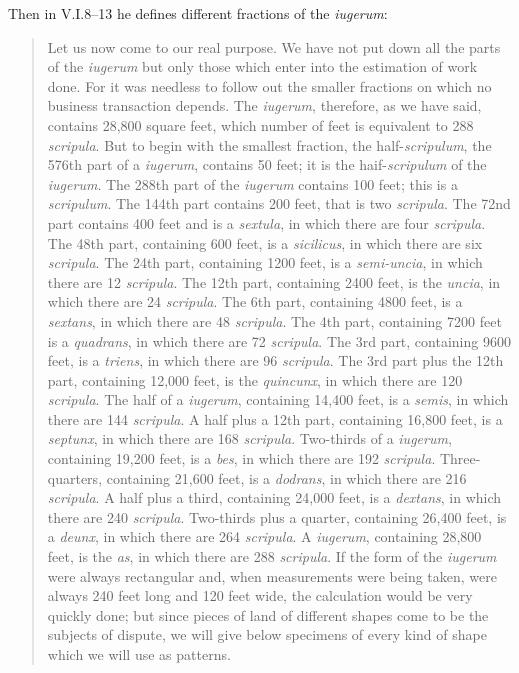 Then in V.I.8--13 \cite[pp.~9--13]{columellaII} he defines different fractions of the {\em iugerum}:

\begin{quote}
Let us now come to our real purpose. We have not put down all the parts of the {\em iugerum} but only those which enter into the estimation of work done. For it was needless to
follow out the smaller fractions on which no business transaction depends. The {\em iugerum}, therefore, as we have said, contains 28,800 square feet, which number of feet is 
equivalent to 288 {\em scripula}. But to begin with the smallest fraction, the half-{\em scripulum}, the 576th part of a {\em iugerum}, contains 50 feet; it is the haif-{\em scripulum} of
the {\em iugerum}. The 288th part of the {\em iugerum} contains 100 feet; this is a {\em scripulum}. The 144th part contains 200 feet, that is two {\em scripula}. The 72nd part contains 
400 feet and is a {\em sextula}, in which there are four {\em scripula}. The 48th part, containing 600 feet, is a {\em sicilicus}, in which there
are six {\em scripula}. The 24th part, containing 1200 feet, is a {\em semi-uncia}, in which there are 12 {\em scripula}. The 12th part, containing 2400 feet, is the {\em uncia}, in
which there are 24 {\em scripula}. The 6th part, containing 4800 feet, is a {\em sextans}, in which there are 48 {\em scripula}. The 4th part, containing 7200 feet is a {\em quadrans},
in which there are 72 {\em scripula}. The 3rd part, containing 9600 feet, is a {\em triens}, in which there are 96 {\em scripula}. The 3rd part plus the 12th part, containing 12,000 feet,
is the {\em quincunx}, in which there are 120 {\em scripula}. The half of a {\em iugerum}, containing 14,400 feet, is a {\em semis}, in which there are 144 {\em scripula}. A half plus
a 12th part, containing 16,800 feet, is a {\em septunx}, in which there are 168 {\em scripula}. Two-thirds of a {\em iugerum}, containing 19,200 feet, is a {\em bes}, in which there are
192 {\em scripula}. Three-quarters, containing 21,600 feet, is a {\em dodrans}, in which there are 216 {\em scripula}. A half plus a third, containing 24,000 feet, is a {\em dextans},
in which there are 240 {\em scripula}. Two-thirds plus a quarter, containing 26,400 feet, is a {\em deunx}, in which there are 264 {\em scripula}. A {\em iugerum}, containing 28,800
feet, is the {\em as}, in which there are 288 {\em scripula}. If the form of the {\em iugerum} were always rectangular and, when measurements were being taken, were always
240 feet long and 120 feet wide, the calculation would be very quickly done; but since pieces of land of different shapes come to be the subjects of dispute, we will give below
specimens of every kind of shape which we will use as patterns.
\end{quote}


